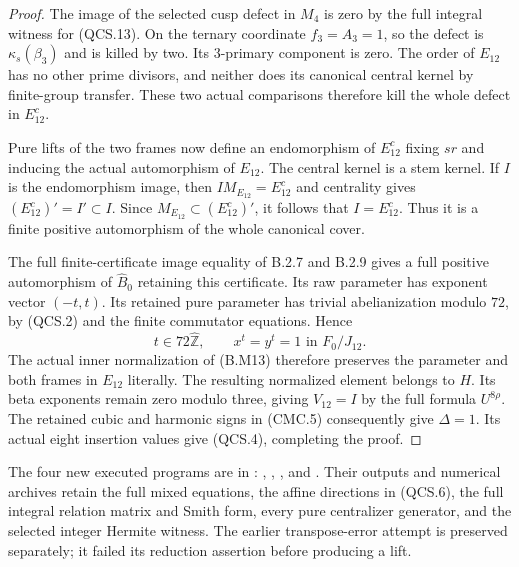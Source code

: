 \begin{proof}
The image of the selected cusp defect in $M_4$ is zero by the full
integral witness for (QCS.13).  On the ternary coordinate $f_3=A_3=1$,
so the defect is $\kappa_s(\beta_3)$ and is killed by two.  Its
$3$-primary component is zero.  The order of $E_{12}$ has no other
prime divisors, and neither does its canonical central kernel by
finite-group transfer.  These two actual comparisons therefore kill
the whole defect in $E_{12}^c$.

Pure lifts of the two frames now define an endomorphism of $E_{12}^c$
fixing $sr$ and inducing the actual automorphism of $E_{12}$.  The
central kernel is a stem kernel.  If $I$ is the endomorphism image,
then $I M_{E_{12}}=E_{12}^c$ and centrality gives
$(E_{12}^c)'=I'\subset I$.  Since
$M_{E_{12}}\subset(E_{12}^c)'$, it follows that $I=E_{12}^c$.
Thus it is a finite positive automorphism of the whole canonical cover.

The full finite-certificate image equality of B.2.7 and B.2.9 gives
a full positive automorphism of $\widehat B_0$ retaining this certificate.
Its raw parameter has exponent vector $(-t,t)$.  Its retained pure
parameter has trivial abelianization modulo $72$, by (QCS.2) and
the finite commutator equations.  Hence
\[
             t\in72\widehat{\mathbb Z},\qquad
             x^t=y^t=1\text{ in }F_0/J_{12}.
 \tag{QCS.15}
\]
The actual inner normalization of (B.M13) therefore preserves the
parameter and both frames in $E_{12}$ literally.  The resulting
normalized element belongs to $H$.  Its beta exponents remain zero
modulo three, giving $V_{12}=I$ by the full formula $U^{8\rho}$.
The retained cubic and harmonic signs in (CMC.5) consequently give
$\Delta=1$.  Its actual eight insertion values give (QCS.4), completing
the proof.
\end{proof}

The four new executed programs are in
:
,
,
, and
.
Their outputs and numerical archives retain the full mixed equations,
the affine directions in (QCS.6), the full integral relation matrix and
Smith form, every pure centralizer generator, and the selected integer
Hermite witness.  The earlier transpose-error attempt is preserved
separately; it failed its reduction assertion before producing a lift.

